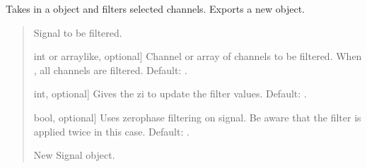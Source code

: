 \documentclass[letterpaper,10pt,english]{sphinxmanual}
\begin{document}
\begin{fulllineitems}
\begin{fulllineitems}
\label{\detokenize{classes:dsptools.classes.filter_class.Filter.filter_signal}}
\pysigstartsignatures
{}
\pysigstopsignatures
\sphinxAtStartPar
Takes in a  object and filters selected channels. Exports a
new  object.
\begin{quote}\begin{description}
\begin{description}
\sphinxlineitem{\sphinxstylestrong{signal}}{[}\sphinxtitleref{Signal}{]}
\sphinxAtStartPar
Signal to be filtered.

\sphinxlineitem{\sphinxstylestrong{channel}}{[}int or array\sphinxhyphen{}like, optional{]}
\sphinxAtStartPar
Channel or array of channels to be filtered. When , all
channels are filtered. Default: .

\sphinxlineitem{\sphinxstylestrong{activate\_zi}}{[}int, optional{]}
\sphinxAtStartPar
Gives the zi to update the filter values. Default: .

\sphinxlineitem{\sphinxstylestrong{zero\_phase}}{[}bool, optional{]}
\sphinxAtStartPar
Uses zero\sphinxhyphen{}phase filtering on signal. Be aware that the filter
is applied twice in this case. Default: .

\end{description}

\begin{description}
\sphinxlineitem{\sphinxstylestrong{new\_signal}}{[}\sphinxtitleref{Signal}{]}
\sphinxAtStartPar
New Signal object.

\end{description}


\end{description}
\end{quote}
\end{fulllineitems}
\end{fulllineitems}
\end{document}
